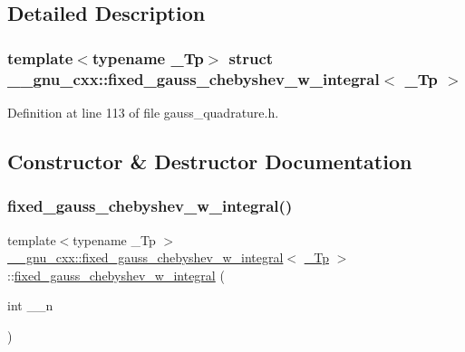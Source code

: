 \subsection{Detailed Description}
\subsubsection*{template$<$typename \+\_\+\+Tp$>$\newline
struct \+\_\+\+\_\+gnu\+\_\+cxx\+::fixed\+\_\+gauss\+\_\+chebyshev\+\_\+w\+\_\+integral$<$ \+\_\+\+Tp $>$}



Definition at line 113 of file gauss\+\_\+quadrature.\+h.



\subsection{Constructor \& Destructor Documentation}
\mbox{\label{struct____gnu__cxx_1_1fixed__gauss__chebyshev__w__integral_a2b104180bab0cc9ffbd5b1d1644baff5}} 
\subsubsection{\texorpdfstring{fixed\+\_\+gauss\+\_\+chebyshev\+\_\+w\+\_\+integral()}{fixed\_gauss\_chebyshev\_w\_integral()}}
{\footnotesize\ttfamily template$<$typename \+\_\+\+Tp $>$ \\
\hyperlink{struct____gnu__cxx_1_1fixed__gauss__chebyshev__w__integral}{\+\_\+\+\_\+gnu\+\_\+cxx\+::fixed\+\_\+gauss\+\_\+chebyshev\+\_\+w\+\_\+integral}$<$ \hyperlink{namespace____gnu__cxx_a3b19a9c800ca194374ef9172290f7d79}{\+\_\+\+Tp} $>$\+::\hyperlink{struct____gnu__cxx_1_1fixed__gauss__chebyshev__w__integral}{fixed\+\_\+gauss\+\_\+chebyshev\+\_\+w\+\_\+integral} (\begin{DoxyParamCaption}\item[{int}]{\+\_\+\+\_\+n }\end{DoxyParamCaption})\hspace{0.3cm}{\ttfamily [explicit]}}

